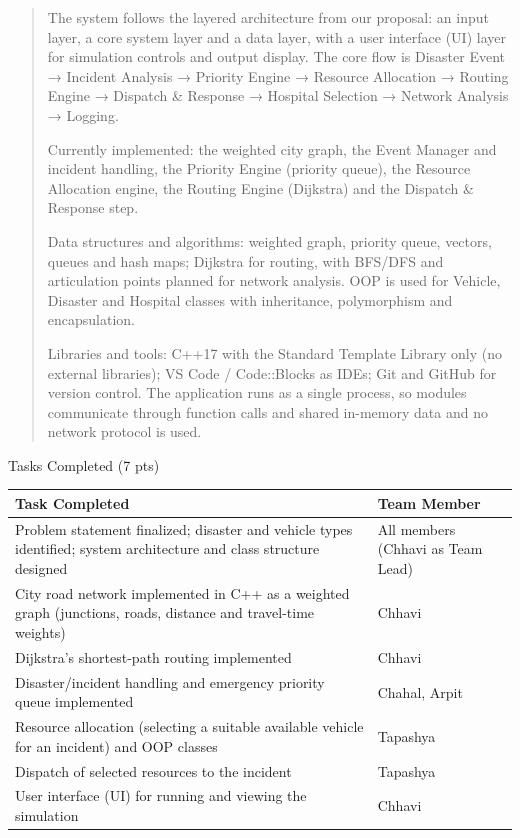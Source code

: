 \documentclass[
]{article}
\newcounter{none} %
\begin{document}
\begin{quote}
The system follows the layered architecture from our proposal: an input
layer, a core system layer and a data layer, with a user interface (UI)
layer for simulation controls and output display. The core flow is
Disaster Event → Incident Analysis → Priority Engine → Resource
Allocation → Routing Engine → Dispatch \& Response → Hospital Selection
→ Network Analysis → Logging.

Currently implemented: the weighted city graph, the Event Manager and
incident handling, the Priority Engine (priority queue), the Resource
Allocation engine, the Routing Engine (Dijkstra) and the Dispatch \&
Response step.

Data structures and algorithms: weighted graph, priority queue, vectors,
queues and hash maps; Dijkstra for routing, with BFS/DFS and
articulation points planned for network analysis. OOP is used for
Vehicle, Disaster and Hospital classes with inheritance, polymorphism
and encapsulation.

Libraries and tools: C++17 with the Standard Template Library only (no
external libraries); VS Code / Code::Blocks as IDEs; Git and GitHub for
version control. The application runs as a single process, so modules
communicate through function calls and shared in-memory data and no
network protocol is used.
\end{quote}

Tasks Completed (7 pts)

{\def\LTcaptype{none} %
\begin{longtable}[]{@{}
  >{\raggedright\arraybackslash}p{}
  >{\raggedright\arraybackslash}p{}@{}}
\toprule\noalign{}
\begin{minipage}[b]{\linewidth}\raggedright
\textbf{Task Completed}
\end{minipage} & \begin{minipage}[b]{\linewidth}\raggedright
\textbf{Team Member}
\end{minipage} \\
\midrule\noalign{}
\endhead
\bottomrule\noalign{}
\endlastfoot
Problem statement finalized; disaster and vehicle types identified;
system architecture and class structure designed & All members (Chhavi
as Team Lead) \\
City road network implemented in C++ as a weighted graph (junctions,
roads, distance and travel-time weights) & Chhavi \\
Dijkstra's shortest-path routing implemented & Chhavi \\
Disaster/incident handling and emergency priority queue implemented &
Chahal, Arpit \\
Resource allocation (selecting a suitable available vehicle for an
incident) and OOP classes & Tapashya \\
Dispatch of selected resources to the incident & Tapashya \\
User interface (UI) for running and viewing the simulation & Chhavi \\
\end{longtable}
}
\end{document}

